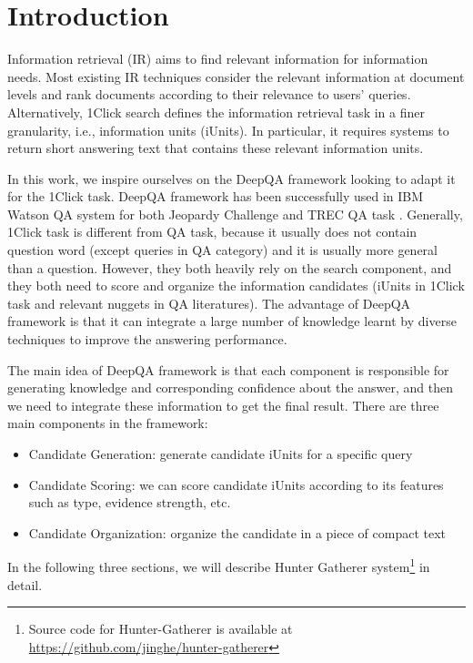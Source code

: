 
\section{Introduction}

Information retrieval (IR) aims to find relevant information for information needs.
Most existing IR techniques consider the relevant information at document levels and rank documents according to their relevance to users' queries.
Alternatively, 1Click search defines the information retrieval task in a finer granularity, i.e., information units (iUnits).
In particular, it requires systems to return short answering text that contains these relevant information units.


In this work, we inspire ourselves on the DeepQA framework looking to adapt it for the 1Click task.
DeepQA framework has been successfully used in IBM Watson QA system for both Jeopardy Challenge and TREC QA task \cite{ferrucci_etal_AI10}.
Generally, 1Click task is different from QA task, because it usually does not contain question word (except queries in QA category) and it is usually more general than a question.
However, they both heavily rely on the search component, and they both need to score and organize the information candidates (iUnits in 1Click task and relevant nuggets in QA literatures).
The advantage of DeepQA framework is that it can integrate a large number of knowledge learnt by diverse techniques to improve the answering performance.



The main idea of DeepQA framework is that each component is responsible for generating knowledge and corresponding confidence about the answer, and then we need to integrate these information to get the final result.
There are three main components in the framework:

\begin{itemize}
\item Candidate Generation: generate candidate iUnits for a specific query
\item Candidate Scoring: we can score candidate iUnits according to its features such as type, evidence strength, etc.
\item Candidate Organization: organize the candidate in a piece of compact text
\end{itemize}


In the following three sections, we will describe Hunter Gatherer system\footnote{Source code for Hunter-Gatherer is available at \url{https://github.com/jinghe/hunter-gatherer}} in detail.

